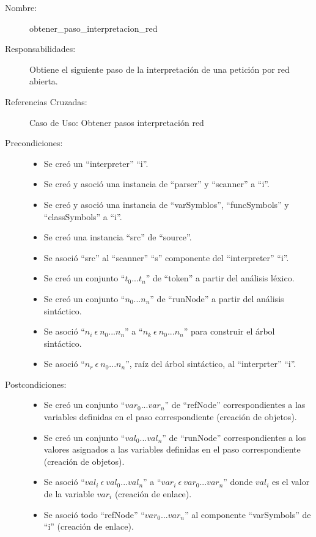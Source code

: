 	\begin{description}
		\item [Nombre:] obtener\_paso\_interpretacion\_red
		\item [Responsabilidades:] Obtiene el siguiente paso de la interpretación de una petición por red abierta.
		\item [Referencias Cruzadas: ] Caso de Uso: Obtener pasos interpretación red
      \item [Precondiciones:] \hfill
      \begin {itemize}
         \item Se creó un ``interpreter'' ``i''.
         \item Se creó y asoció una instancia de ``parser'' y ``scanner'' a ``i''.
         \item Se creó y asoció una instancia de ``varSymblos'', ``funcSymbols'' y ``classSymbols'' a ``i''.
         \item Se creó una instancia ``src'' de ``source''.
         \item Se asoció ``src'' al ``scanner'' ``s'' componente del ``interpreter'' ``i''. 
         \item Se creó un conjunto ``$t_0...t_n$'' de ``token'' a partir del análisis léxico.
         \item Se creó un conjunto ``$n_0...n_n$'' de ``runNode'' a partir del análisis sintáctico.
         \item Se asoció ``$n_i\ \epsilon\ n_0...n_n$'' a ``$n_k\ \epsilon\ n_0...n_n$'' para construir el árbol sintáctico.
         \item Se asoció  ``$n_r\ \epsilon\ n_0...n_n$'', raíz del árbol sintáctico, al ``interprter'' ``i''.
      \end{itemize}
      \item [Postcondiciones:] \hfill
      \begin {itemize}
         \item Se creó un conjunto ``$var_0...var_n$'' de ``refNode'' correspondientes a las variables definidas en el paso correspondiente (creación de objetos).
         \item Se creó un conjunto ``$val_0...val_n$'' de ``runNode'' correspondientes a los valores asignados a las variables definidas en el paso correspondiente (creación de objetos).
         \item Se asoció ``$val_i\ \epsilon\ val_0...val_n$'' a  ``$var_i\ \epsilon\ var_0...var_n$'' donde $val_i$ es el valor de la variable $var_i$ (creación de enlace). 
         \item Se asoció todo ``refNode'' ``$var_0...var_n$'' al componente ``varSymbols'' de ``i'' (creación de enlace). 

\end{itemize}
\end{description}
